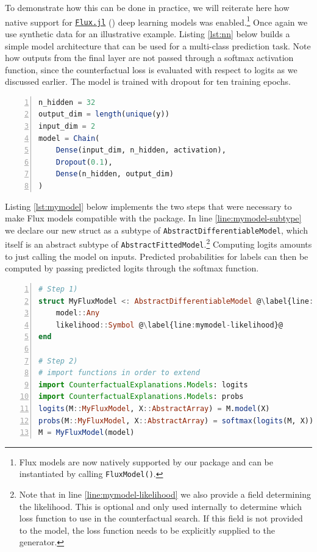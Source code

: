 \documentclass{juliacon}
\begin{document}
To demonstrate how this can be done in practice, we will reiterate here
how native support for \href{https://fluxml.ai/}{\texttt{Flux.jl}}
(\cite{innes2018flux}) deep learning models was enabled.\footnote{Flux
  models are now natively supported by our package and can be
  instantiated by calling \texttt{FluxModel()}.} Once again we use
synthetic data for an illustrative example. Listing \ref{lst:nn} below
builds a simple model architecture that can be used for a multi-class
prediction task. Note how outputs from the final layer are not passed
through a softmax activation function, since the counterfactual loss is
evaluated with respect to logits as we discussed earlier. The model is
trained with dropout for ten training epochs.

\begin{lstlisting}[language=Julia, escapechar=@, numbers=left, label={lst:nn}, caption={}]
n_hidden = 32
output_dim = length(unique(y))
input_dim = 2
model = Chain(
    Dense(input_dim, n_hidden, activation),
    Dropout(0.1),
    Dense(n_hidden, output_dim)
)  
\end{lstlisting}

Listing \ref{lst:mymodel} below implements the two steps that were
necessary to make Flux models compatible with the package. In line
\ref{line:mymodel-subtype} we declare our new struct as a subtype of
\texttt{AbstractDifferentiableModel}, which itself is an abstract
subtype of \texttt{AbstractFittedModel}.\footnote{Note that in line
  \ref{line:mymodel-likelihood} we also provide a field determining the
  likelihood. This is optional and only used internally to determine
  which loss function to use in the counterfactual search. If this field
  is not provided to the model, the loss function needs to be explicitly
  supplied to the generator.} Computing logits amounts to just calling
the model on inputs. Predicted probabilities for labels can then be
computed by passing predicted logits through the softmax function.

\begin{lstlisting}[language=Julia, escapechar=@, numbers=left, label={lst:mymodel}, caption={}]
# Step 1)
struct MyFluxModel <: AbstractDifferentiableModel @\label{line:mymodel-subtype}@
    model::Any
    likelihood::Symbol @\label{line:mymodel-likelihood}@
end

# Step 2)
# import functions in order to extend
import CounterfactualExplanations.Models: logits
import CounterfactualExplanations.Models: probs 
logits(M::MyFluxModel, X::AbstractArray) = M.model(X)
probs(M::MyFluxModel, X::AbstractArray) = softmax(logits(M, X))
M = MyFluxModel(model)
\end{lstlisting}
\end{document}
